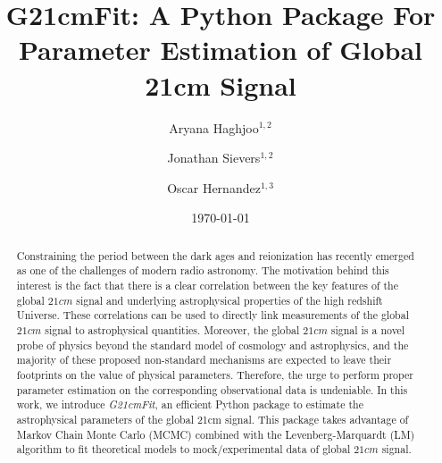 \documentclass[%
 reprint,
 amsmath,amssymb,
 aps,
]{revtex4-2}
\begin{document}

\title{G21cmFit: A Python Package For Parameter Estimation of Global 21cm Signal}

\author{Aryana Haghjoo$^{1,2}$}
\author{Jonathan Sievers$^{1,2}$}%
\author{Oscar Hernandez$^{1,3}$}
%

\begin{comment}
    
\collaboration{MUSO Collaboration}%

\author{Charlie Author}
 \homepage{http://www.Second.institution.edu/~Charlie.Author}
\affiliation{
 Second institution and/or address\\
 This line break forced%
}%
\affiliation{
 Third institution, the second for Charlie Author
}%
\author{Delta Author}
\affiliation{%
 Authors' institution and/or address\\
 This line break forced with \textbackslash\textbackslash
}%

\collaboration{CLEO Collaboration}%
\end{comment}

\date{\today}%

\begin{abstract} 
Constraining the period between the dark ages and reionization has recently emerged as one of the challenges of modern radio astronomy. The motivation behind this interest is the fact that there is a clear correlation between the key features of the global $21cm$ signal and underlying astrophysical properties of the high redshift Universe. These correlations can be used to directly link measurements of the global $21cm$ signal to astrophysical quantities. Moreover, the global $21cm$ signal is a novel probe of physics beyond the standard model of cosmology and astrophysics, and the majority of these proposed non-standard mechanisms are expected to leave their footprints on the value of physical parameters. Therefore, the urge to perform proper parameter estimation on the corresponding observational data is undeniable. In this work, we introduce \emph{G21cmFit}, an efficient Python package to estimate the astrophysical parameters of the global 21cm signal. This package takes advantage of Markov Chain Monte Carlo (MCMC) combined with the Levenberg-Marquardt (LM) algorithm to fit theoretical models to mock/experimental data of global $21cm$ signal.
\end{abstract}
\end{document}
